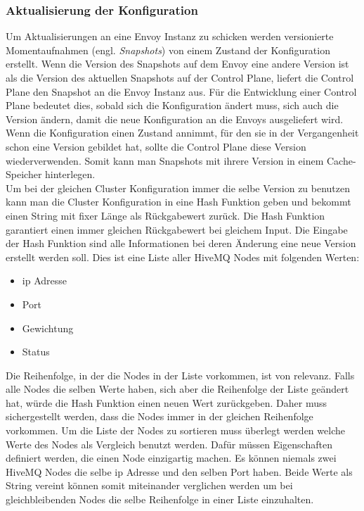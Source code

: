 \subsubsection{Aktualisierung der Konfiguration}
Um Aktualisierungen an eine Envoy Instanz zu schicken werden versionierte Momentaufnahmen (engl. \textit{Snapshots}) von einem Zustand der Konfiguration erstellt. Wenn die Version des Snapshots auf dem Envoy eine andere Version ist als die Version des aktuellen Snapshots auf der Control Plane, liefert die Control Plane den Snapshot an die Envoy Instanz aus.
Für die Entwicklung einer Control Plane bedeutet dies, sobald sich die Konfiguration ändert muss, sich auch die Version ändern, damit die neue Konfiguration an die Envoys ausgeliefert wird. Wenn die Konfiguration einen Zustand annimmt, für den sie in der Vergangenheit schon eine Version gebildet hat, sollte die Control Plane diese Version wiederverwenden. Somit kann man Snapshots mit ihrere Version in einem Cache-Speicher hinterlegen.
\\
Um bei der gleichen Cluster Konfiguration immer die selbe Version zu benutzen kann man die Cluster Konfiguration in eine Hash Funktion geben und bekommt einen String mit fixer Länge als Rückgabewert zurück. Die Hash Funktion garantiert einen immer gleichen Rückgabewert bei gleichem Input.
Die Eingabe der Hash Funktion sind alle Informationen bei deren Änderung eine neue Version erstellt werden soll. Dies ist eine Liste aller HiveMQ Nodes mit folgenden Werten:
\begin{itemize}
  \item \ac{ip} Adresse
  \item Port
  \item Gewichtung
  \item Status
\end{itemize}
Die Reihenfolge, in der die Nodes in der Liste vorkommen, ist von relevanz. Falls alle Nodes die selben Werte haben, sich aber die Reihenfolge der Liste geändert hat, würde die Hash Funktion einen neuen Wert zurückgeben. Daher muss sichergestellt werden, dass die Nodes immer in der gleichen Reihenfolge vorkommen. Um die Liste der Nodes zu sortieren muss überlegt werden welche Werte des Nodes als Vergleich benutzt werden. Dafür müssen Eigenschaften definiert werden, die einen Node einzigartig machen.
Es können niemals zwei HiveMQ Nodes die selbe \ac{ip} Adresse und den selben Port haben. Beide Werte als String vereint können somit miteinander verglichen werden um bei gleichbleibenden Nodes die selbe Reihenfolge in einer Liste einzuhalten.

